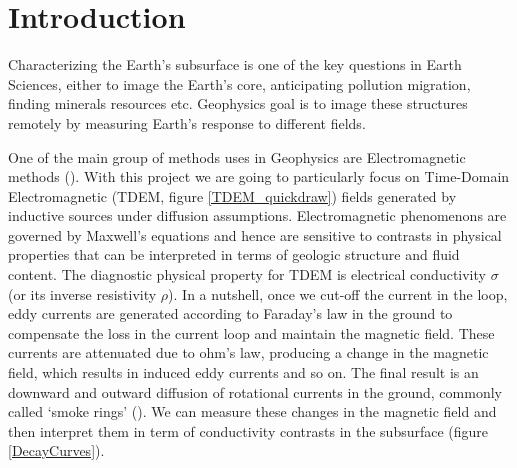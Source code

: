 \documentclass[twoside]{article}
\begin{document}


\section{Introduction}
Characterizing the Earth's subsurface is one of the key questions in Earth Sciences, either to image the Earth's core, anticipating pollution migration, finding minerals resources etc. Geophysics goal is to image these structures remotely by measuring Earth's response to different fields. 

One of the main group of methods uses in Geophysics are Electromagnetic methods (\cite{WH:1988}). With this project we are going to particularly focus on Time-Domain Electromagnetic (TDEM, figure \ref{TDEM_quickdraw}) fields generated by inductive sources under diffusion assumptions. Electromagnetic phenomenons are governed by Maxwell's equations and hence are sensitive to contrasts in physical properties that can be interpreted in terms of geologic structure and fluid content. The diagnostic physical property for TDEM is electrical conductivity $\sigma$ (or its inverse resistivity $\rho$). In a nutshell, once we cut-off the current in the loop, eddy currents are generated according to Faraday's law in the ground to compensate the loss in the current loop and maintain the magnetic field. These currents are attenuated due to ohm's law, producing a change in the magnetic field, which results in induced eddy currents and so on. The final result is an downward and outward diffusion of rotational currents in the ground, commonly called `smoke rings' (\cite{Nabighian}). We can measure these changes in the magnetic field and then interpret them in term of conductivity contrasts in the subsurface (figure \ref{DecayCurves}).
\end{document}
